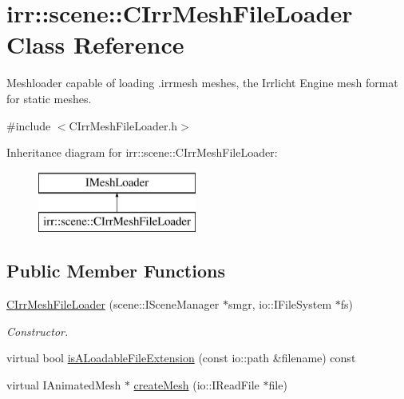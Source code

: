 \hypertarget{classirr_1_1scene_1_1_c_irr_mesh_file_loader}{\section{irr\-:\-:scene\-:\-:C\-Irr\-Mesh\-File\-Loader Class Reference}
\label{classirr_1_1scene_1_1_c_irr_mesh_file_loader}
}


Meshloader capable of loading .irrmesh meshes, the Irrlicht Engine mesh format for static meshes.  




{\ttfamily \#include $<$C\-Irr\-Mesh\-File\-Loader.\-h$>$}

Inheritance diagram for irr\-:\-:scene\-:\-:C\-Irr\-Mesh\-File\-Loader\-:\begin{figure}[H]
\begin{center}
\leavevmode
\includegraphics[height=2.000000cm]{classirr_1_1scene_1_1_c_irr_mesh_file_loader}
\end{center}
\end{figure}
\subsection*{Public Member Functions}
\begin{DoxyCompactItemize}
\item 
\hypertarget{classirr_1_1scene_1_1_c_irr_mesh_file_loader_ab0164aff66cbedf40bfee0c2e94f94a8}{\hyperlink{classirr_1_1scene_1_1_c_irr_mesh_file_loader_ab0164aff66cbedf40bfee0c2e94f94a8}{C\-Irr\-Mesh\-File\-Loader} (scene\-::\-I\-Scene\-Manager $\ast$smgr, io\-::\-I\-File\-System $\ast$fs)}\label{classirr_1_1scene_1_1_c_irr_mesh_file_loader_ab0164aff66cbedf40bfee0c2e94f94a8}

\begin{DoxyCompactList}\small\item\em Constructor. \end{DoxyCompactList}\item 
virtual bool \hyperlink{classirr_1_1scene_1_1_c_irr_mesh_file_loader_a30f545c1e096077b56cec53983795326}{is\-A\-Loadable\-File\-Extension} (const io\-::path \&filename) const 
\item 
virtual I\-Animated\-Mesh $\ast$ \hyperlink{classirr_1_1scene_1_1_c_irr_mesh_file_loader_a90bc737ffc6ebaedf28a5b5b2eb35bfe}{create\-Mesh} (io\-::\-I\-Read\-File $\ast$file)
\end{DoxyCompactItemize}


